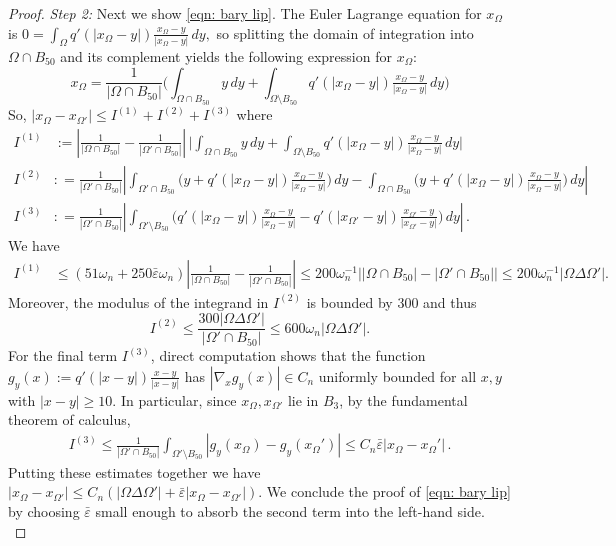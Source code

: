 \documentclass[10pt, reqno]{amsart}
\numberwithin{equation}{section}
\def\e{\varepsilon}
\def\W{\Omega}
\def\baryEps{\bar{\e}}
\def\TBF{q}
\begin{document}
\begin{proof}
{\it Step 2: } Next we show \eqref{eqn: bary lip}. The Euler Lagrange equation for $x_\W$ is 
$0 = \int_\W \TBF'(|x_\W-y|) \frac{x_\W - y}{|x_\W-y|} \,dy,$ so splitting the domain of integration into $\W \cap B_{50}$ and its complement yields the following expression for $x_\W$:
\[
x_\W = \frac{1}{|\W \cap B_{50}|}\Big( \int_{\W\cap B_{50}} y\,dy + \int_{\W \setminus B_{50}} \TBF'(|x_\W -y|) \tfrac{ x_\W -y}{|x_\W -y|} \,dy \Big)
\]
So, $
|x_\W -x_{\W'}| \leq I^{(1)} + I^{(2)} + I^{(3)}$
where 
\begin{align*}
	I^{(1)} &:=  \left| \frac{1}{|\W \cap B_{50}|} -  \frac{1}{|\W' \cap B_{50}|}\right| \, 
	 \bigg| \int_{\W\cap B_{50}} y\,dy + \int_{\W \setminus B_{50}} \TBF'(|x_\W -y|) \tfrac{ x_\W -y}{|x_\W -y|} \,dy \bigg|\\
	 I^{(2)} & : = \frac{1}{|\W' \cap B_{50}|}
	 \left|  \int_{\W' \cap B_{50}} \Big( y + \TBF'(|x_\W - y|) \tfrac{x_\W - y}{|x_{\W }-y|} \Big) \,dy -   \int_{\W \cap B_{50}} \Big( y + \TBF'(|x_\W - y|) \tfrac{x_\W - y}{|x_{\W }-y|} \Big) \,dy\right|\\
	 I^{(3)} &: =\frac{1}{|\W' \cap B_{50} |} \left| \int_{\W' \setminus B_{50}} \Big(\TBF'(|x_\W - y|) \tfrac{x_\W - y}{|x_{\W }-y|}  -\TBF'(|x_{\W'} - y|) \tfrac{x_{\W'} - y}{|x_{\W' }-y|} \Big)\,dy  \right|  \,.
\end{align*}
We have 
\begin{align*}
	I^{(1)} 
	 &\leq  \left( 51  \omega_n +250 \baryEps \omega_n\right) \left| \frac{1}{|\W \cap B_{50}|} -  \frac{1}{|\W' \cap B_{50}|}\right| 
	  \leq 200\omega_n^{-1} \big| |\W \cap B_{50}| - |\W' \cap B_{50}|\big| \leq 200\omega_n^{-1}|\W \Delta \W'|.
\end{align*}
Moreover, the modulus of the integrand in $I^{(2)}$ is bounded by $300$ and thus  
\[
I^{(2)}  \leq \frac{300 |\W\Delta \W'| }{|\W' \cap B_{50}|} \leq 600 \omega_n  |\W\Delta \W'|.
\]
 For the final term $I^{(3)}$, direct computation shows that  the function ${g}_y(x):= \TBF'(|x-y|) \frac{x-y}{|x-y|}$ has $|\nabla_x {g}_y(x)|\in C_n$ uniformly bounded for all $x,y$ with $|x-y| \geq 10$. In particular, since $x_\W, x_{\W'}$ lie in $B_3$, by the fundamental theorem of calculus,
\begin{align*}
		I^{(3)} \leq \frac{1}{|\W' \cap B_{50}|} 
		 \int_{\W' \setminus B_{50}} 
		 |{g}_y(x_\W) - {g}_y(x_\W')| \leq C_n \baryEps  |x_\W - x_\W'| \,. 
\end{align*}
Putting these estimates together we have $|x_\W -x_{\W'}| \leq C_n ( |\W\Delta \W'| + \baryEps |x_\W -x_{\W'}|)$. We conclude the proof of \eqref{eqn: bary lip} by choosing $\baryEps$ small enough to absorb the second term into the left-hand side.\\



\end{proof}
\end{document}
